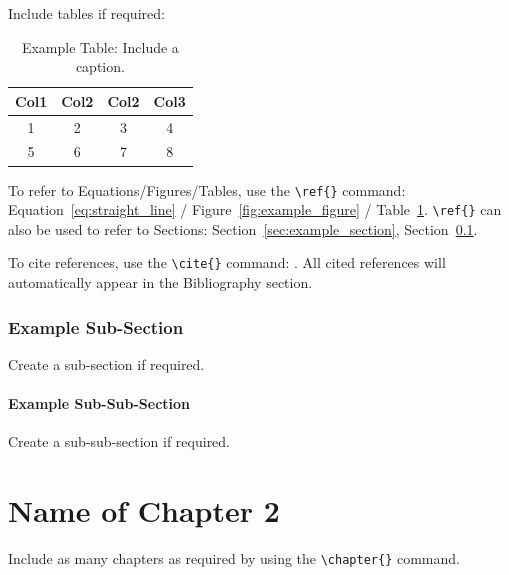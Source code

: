 \documentclass[a4paper, 12pt, twoside]{report}
\begin{document}
\newpage

Include tables if required:
\begin{table}[ht!]
\centering
    \begin{tabular}{||c c c c||} 
     \hline
     Col1 & Col2 & Col2 & Col3 \\ [0.5ex] 
     \hline\hline
     1 & 2 & 3 & 4 \\ 
     \hline
     5 & 6 & 7 & 8 \\ 
     \hline
    \end{tabular}
\caption{Example Table: Include a caption.}
\label{table:example_table}
\end{table}

To refer to Equations/Figures/Tables, use the \verb!\ref{}! command: Equation~\ref{eq:straight_line} / Figure~\ref{fig:example_figure} / Table~\ref{table:example_table}. \verb!\ref{}! can also be used to refer to Sections: Section~\ref{sec:example_section}, Section~\ref{ssec:example_subsection}.

To cite references, use the \verb!\cite{}! command: \cite{article_name}. All cited references will automatically appear in the Bibliography section.

\subsection{Example Sub-Section}\label{ssec:example_subsection}

Create a sub-section if required.

\subsubsection{Example Sub-Sub-Section}\label{sssec:example_subsubsection}

Create a sub-sub-section if required.


\clearpage

\newpage
\chapter{Name of Chapter 2}\label{chap:chapter2}

\renewcommand\thefigure{\thechapter.\arabic{figure}}    
\renewcommand{\theequation}{\thechapter.\arabic{equation}}
\setcounter{equation}{0}
\setcounter{figure}{0}

Include as many chapters as required by using the \verb!\chapter{}! command.
\end{document}
